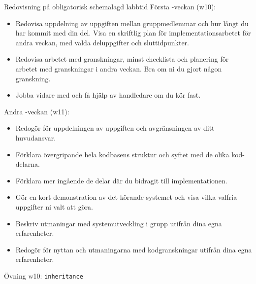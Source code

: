 \begin{Slide}{Redovisning på obligatorisk schemalagd labbtid}
Första -veckan (w10):
\begin{itemize}\SlideFontTiny
\item Redovisa uppdelning av uppgiften mellan gruppmedlemmar och hur långt du har kommit med din del. Visa en skriftlig plan för implementationsarbetet för andra veckan, med valda deluppgifter och sluttidpunkter.
\item Redovisa arbetet med granskningar, minst checklista och planering för arbetet med granskningar i andra veckan. Bra om ni du gjort någon granskning.
\item Jobba vidare med  och få hjälp av handledare om du kör fast. 
\end{itemize}
Andra -veckan (w11):
\begin{itemize}\SlideFontTiny
\item Redogör för uppdelningen av uppgiften och avgränsningen av ditt huvudansvar.
\item Förklara övergripande hela kodbasens struktur och syftet med de olika kod-delarna.
\item Förklara mer ingående de delar där du bidragit till implementationen.
\item Gör en kort demonstration av det körande systemet och visa vilka valfria uppgifter ni valt att göra.
\item Beskriv utmaningar med systemutveckling i grupp utifrån dina egna erfarenheter.
\item Redogör för nyttan och utmaningarna med kodgranskningar utifrån dina egna erfarenheter.  
\end{itemize}
\end{Slide}

\begin{Slide}{Övning w10: \texttt{inheritance}}
\begin{itemize}\SlideFontTiny

\end{itemize}
\end{Slide}

\fi
